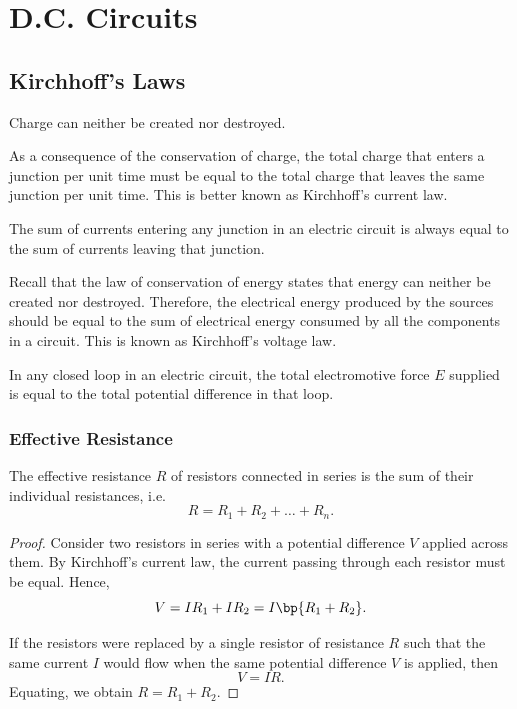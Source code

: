 \chapter{D.C. Circuits}

\section{Kirchhoff's Laws}

\begin{law}
    Charge can neither be created nor destroyed.    
\end{law}

As a consequence of the conservation of charge, the total charge that enters a junction per unit time must be equal to the total charge that leaves the same junction per unit time. This is better known as Kirchhoff's current law.

\begin{law}
    The sum of currents entering any junction in an electric circuit is always equal to the sum of currents leaving that junction.
\end{law}

Recall that the law of conservation of energy states that energy can neither be created nor destroyed. Therefore, the electrical energy produced by the sources should be equal to the sum of electrical energy consumed by all the components in a circuit. This is known as Kirchhoff's voltage law.

\begin{law}
    In any closed loop in an electric circuit, the total electromotive force $E$ supplied is equal to the total potential difference in that loop.
\end{law}

\subsection{Effective Resistance}

\begin{proposition}
    The effective resistance $R$ of resistors connected in series is the sum of their individual resistances, i.e. \[R = R_1 + R_2 + \dots + R_n.\]
\end{proposition}
\begin{proof}
    Consider two resistors in series with a potential difference $V$ applied across them. By Kirchhoff's current law, the current passing through each resistor must be equal. Hence, \[V = IR_1 + IR_2 = I\bp{R_1 + R_2}.\]
    
    If the resistors were replaced by a single resistor of resistance $R$ such that the same current $I$ would flow when the same potential difference $V$ is applied, then \[V = IR.\] Equating, we obtain $R = R_1 + R_2$.
\end{proof}

